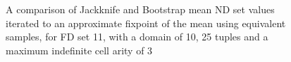 \begin{figure}
\begin{minipage}{7cm}
\centerline{}
\end{minipage}
\hfill
\begin{minipage}{7cm}
\centerline{}
\end{minipage}
\caption{\label{graph:7.3} {A comparison of Jackknife and
Bootstrap mean ND set values iterated to an approximate fixpoint of
the mean using equivalent samples, for FD set 11, with a domain of 10,
25 tuples and a maximum indefinite cell arity of 3}}
\end{figure}


